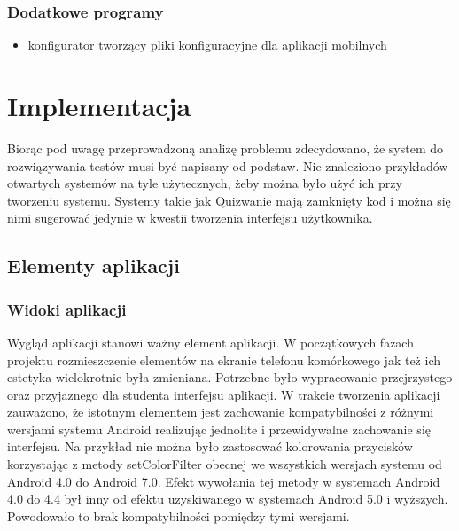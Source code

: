 \documentclass[eng]{mgr}
\begin{document}
			\subsection{Dodatkowe programy}
			\begin{itemize}
				\item konfigurator tworzący pliki konfiguracyjne dla aplikacji mobilnych
			\end{itemize}
	
	\chapter{Implementacja}
	
	Biorąc pod uwagę przeprowadzoną analizę problemu zdecydowano, że system do rozwiązywania testów musi być napisany od podstaw. Nie znaleziono przykładów otwartych systemów na tyle użytecznych, żeby można było użyć ich przy tworzeniu systemu. Systemy takie jak Quizwanie mają zamknięty kod i można się nimi sugerować jedynie w kwestii tworzenia interfejsu użytkownika.
	
		\section{Elementy aplikacji}
	
			\subsection{Widoki aplikacji}
		
			Wygląd aplikacji stanowi ważny element aplikacji. W początkowych fazach projektu rozmieszczenie elementów na ekranie telefonu komórkowego jak też ich estetyka wielokrotnie była zmieniana. Potrzebne było wypracowanie przejrzystego oraz przyjaznego dla studenta interfejsu aplikacji. W trakcie tworzenia aplikacji zauważono, że istotnym elementem jest zachowanie kompatybilności z różnymi wersjami systemu Android realizując jednolite i przewidywalne zachowanie się interfejsu.
			Na przykład nie można było zastosować kolorowania przycisków korzystając z metody setColorFilter obecnej we wszystkich wersjach systemu od Android 4.0 do Android 7.0. Efekt wywołania tej metody w systemach Android 4.0 do 4.4 był inny od efektu uzyskiwanego w systemach Android 5.0 i wyższych. Powodowało to brak kompatybilności pomiędzy tymi wersjami.\\
		
\end{document}
